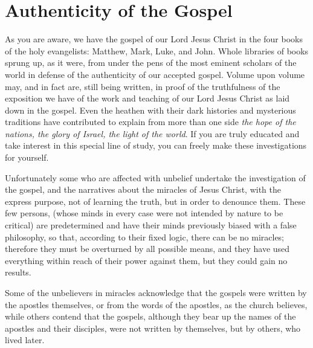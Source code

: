 \chapter{Authenticity of the Gospel}

As you are aware, we have the gospel of our Lord Jesus Christ in the four books of the holy evangelists: Matthew, Mark, Luke, and John. Whole libraries of books sprung up, as it were, from under the pens of the most eminent scholars of the world in defense of the authenticity of our accepted gospel. Volume upon volume may, and in fact are, still being written, in proof of the truthfulness of the exposition we have of the work and teaching of our Lord Jesus Christ as laid down in the gospel. Even the heathen with their dark histories and mysterious traditions have contributed to explain from more than one side \textit{the hope of the nations, the glory of Israel, the light of the world}. If you are truly educated and take interest in this special line of study, you can freely make these investigations for yourself.

Unfortunately some who are affected with unbelief undertake the investigation of the gospel, and the narratives about the miracles of Jesus Christ, with the express purpose, not of learning the truth, but in order to denounce them. These few persons, (whose minds in every case were not intended by nature to be critical) are predetermined and have their minds previously biased with a false philosophy, so that, according to their fixed logic, there can be no miracles; therefore they must be overturned by all possible means, and they have used everything within reach of their power against them, but they could gain no results.

Some of the unbelievers in miracles acknowledge that the gospels were written by the apostles themselves, or from the words of the apostles, as the church believes, while others contend that the gospels, although they bear up the names of the apostles and their disciples, were not written by themselves, but by others, who lived later.

